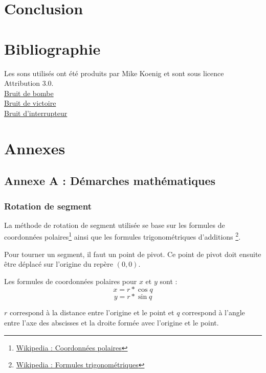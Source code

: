 \documentclass[]{article}
\begin{document}
\section{Conclusion}

\section{Bibliographie}

Les sons utilisés ont été produits par Mike Koenig et sont sous licence Attribution 3.0.\\

\href{http://soundbible.com/106-Car-Explosion.html}{Bruit de bombe}   \\
\href{http://soundbible.com/1003-Ta-Da.html}{Bruit de victoire}       \\
\href{http://soundbible.com/761-Switch.html}{Bruit d’interrupteur}    \\

\section{\label{Annexe}Annexes}

\subsection{Annexe A : Démarches mathématiques}

\subsubsection{\label{AnnexeRotation}Rotation de segment}

La méthode de rotation de segment utilisée se base sur les formules
de coordonnées polaires\footnote{\href{http://fr.wikipedia.org/wiki/Coordonn\%C3\%A9es\_polaires}{Wikipedia : Coordonnées polaires}}
ainsi que les formules trigonométriques d'additions
\footnote{\href{http://fr.wikipedia.org/wiki/Trigonom\%C3\%A9trie}{Wikipedia : Formules trigonométriques}}.

Pour tourner un segment, il faut un point de pivot. Ce point de pivot
doit ensuite être déplacé sur l'origine du repère $ (0, 0) $.

Les formules de coordonnées polaires pour $ x $ et $ y $ sont :
$$ x = r * \cos{q} $$ 
$$ y = r * \sin{q} $$

$ r $ correspond à la distance entre l'origine et le point et $ q $ correspond 
à l'angle entre l'axe des abscisses et la droite formée avec l'origine et le point.
\end{document}
